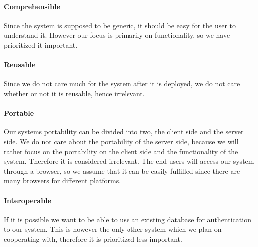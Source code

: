 \paragraph{Comprehensible}
Since the \hdesk[] system is supposed to be generic, it should be easy for the user to understand it.
However our focus is primarily on functionality, so we have prioritized it important.
\paragraph{Reusable}
Since we do not care much for the system after it is deployed, we do not care whether or not it is reusable, hence irrelevant.
\paragraph{Portable}
Our systems portability can be divided into two, the client side and the server side.
We do not care about the portability of the server side, because we will rather focus on the portability on the client side and the functionality of the system.
Therefore it is considered irrelevant.
The end users will access our system through a browser, so we assume that it can be easily fulfilled since there are many browsers for different platforms. \cite{chrome10} 
\paragraph{Interoperable}
If it is possible we want to be able to use an existing database for authentication to our system.
This is however the only other system which we plan on cooperating with, therefore it is prioritized less important.